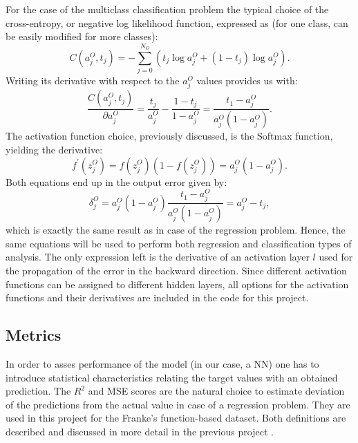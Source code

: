 \documentclass{emulateapj}
\begin{document}
 For the case of the multiclass classification problem the typical choice of the cross-entropy, or negative log likelihood function, expressed as (for one class, can be easily modified for more classes):
 \begin{equation}
     C(a_j^O, t_j)=-\sum_{j=0}^{N_O}\left(t_j\log{a_j^O}+(1-t_j)\log{a_j^O}\right).
 \end{equation}
 Writing its derivative with respect to the $a_j^O$ values provides us with:
  \begin{equation}
     \frac{C(a_j^O, t_j)}{\partial a_{j}^O}=\frac{t_j}{a_j^O}-\frac{1-t_j}{1-a_j^O}=\frac{t_1-a_j^O}{a_j^O(1-a_j^O)}.
 \end{equation}
 The activation function choice, previously discussed, is the Softmax function, yielding the derivative:
 \begin{equation}
     f^{\prime}(z_j^O)=f(z_j^O)(1-f(z_j^O))= a_j^O(1-a_j^O).
 \end{equation}
 Both equations end up in the output error given by:
 \begin{equation}
     \delta_j^O=a_j^O(1-a_j^O)\frac{t_1-a_j^O}{a_j^O(1-a_j^O)}=a_{j}^O-t_j,
 \end{equation}
 which is exactly the same result as in case of the regression problem. Hence, the same equations will be used to perform both regression and classification types of analysis. The only expression left is the derivative of an activation layer $l$ used for the propagation of the error in the backward direction. Since different activation functions can be assigned to different hidden layers, all options for the activation functions and their derivatives are included in the code for this project.
 
 \subsection{Metrics}
 \label{subsec: metrics}
 
 In order to asses performance of the model (in our case, a NN) one has to introduce statistical characteristics relating the target values with an obtained prediction. The $R^2$ and MSE scores are the natural choice to estimate deviation of the predictions from the actual value in case of a regression problem. They are used in this project for the Franke's function-based dataset. Both definitions are described and discussed in more detail in the previous project \cite{proj1, proj1_2}.
 
\end{document}
